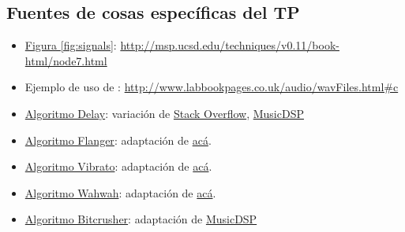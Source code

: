 \subsection{Fuentes de cosas específicas del TP}
\begin{itemize}
\item \underline{Figura \ref{fig:signals}}: \url{http://msp.ucsd.edu/techniques/v0.11/book-html/node7.html}
\item Ejemplo de uso de : \url{http://www.labbookpages.co.uk/audio/wavFiles.html#c}
\item \underline{Algoritmo Delay}: variación de \href{http://stackoverflow.com/questions/5318989/reverb-algorithm}{Stack Overflow}, \href{http://www.musicdsp.org/showArchiveComment.php?ArchiveID=153}{MusicDSP}
\item \underline{Algoritmo Flanger}: adaptación de \href{http://www.cs.cf.ac.uk/Dave/CM0268/Lecture_Examples/Digital_Audio_FX/flanger.m}{acá}.
\item \underline{Algoritmo Vibrato}: adaptación de \href{http://www.cs.cf.ac.uk/Dave/CM0268/Lecture_Examples/Digital_Audio_FX/vibrato.m}{acá}.
\item \underline{Algoritmo Wahwah}: adaptación de \href{http://www.cs.cf.ac.uk/Dave/CM0268/Lecture_Examples/Digital_Audio_FX/wah_wah.m}{acá}.
\item \underline{Algoritmo Bitcrusher}: adaptación de \href{http://www.musicdsp.org/showArchiveComment.php?ArchiveID=139}{MusicDSP}

\end{itemize}
 
